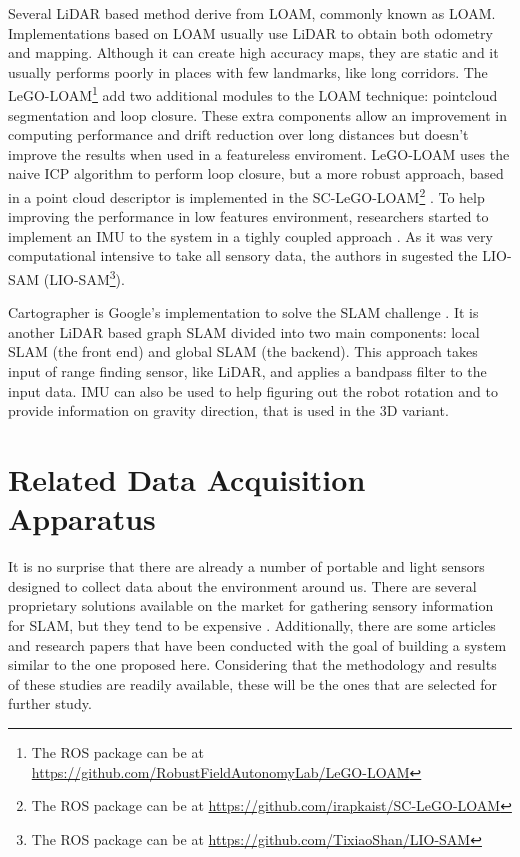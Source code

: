 Several \acs*{LiDAR} based method derive from \acl*{LOAM}, commonly known as \acs*{LOAM}. Implementations based on \acs*{LOAM} usually use \acs*{LiDAR} to obtain both odometry and mapping. Although it can create high accuracy maps, they are static and it usually performs poorly in places with few landmarks, like long corridors. The LeGO-LOAM\footnote{The \acs*{ROS} package can be at \url{https://github.com/RobustFieldAutonomyLab/LeGO-LOAM}} add two additional modules to the \acs*{LOAM} technique: pointcloud segmentation and loop closure. These extra components allow an improvement in computing performance and drift reduction over long distances but doesn't improve the results when used in a featureless enviroment. LeGO-LOAM uses the naive \acs*{ICP} algorithm to perform loop closure, but a more robust approach, based in a point cloud descriptor is implemented in the SC-LeGO-LOAM\footnote{The \acs*{ROS} package can be at \url{https://github.com/irapkaist/SC-LeGO-LOAM}} \cite{kim_scan_2018}. To help improving the performance in low features environment, researchers started to implement an \acs*{IMU} to the system in a tighly coupled approach \cite{ye2019tightly, xu_fast-lio_2021,xu_fast-lio2_2021}. As it was very computational intensive to take all sensory data, the authors in \cite{liosam2020shan} sugested the \acl*{LIO-SAM} (\acs*{LIO-SAM}\footnote{The \acs*{ROS} package can be at \url{https://github.com/TixiaoShan/LIO-SAM}}).

Cartographer is Google's implementation to solve the \acs*{SLAM} challenge \cite{hess_real-time_2016}. It is another \acs*{LiDAR} based graph \acs*{SLAM} divided into two main components: local \acs*{SLAM} (the front end) and global \acs*{SLAM} (the backend). This approach takes input of range finding sensor, like \acs*{LiDAR}, and applies a bandpass filter to the input data. \acs*{IMU} can also be used to help figuring out the robot rotation and to provide information on gravity direction, that is used in the 3D variant.
 
\section{Related Data Acquisition Apparatus}

It is no surprise that there are already a number of portable and light sensors designed to collect data about the environment around us. There are several proprietary solutions available on the market for gathering sensory information for \acs*{SLAM}, but they tend to be expensive \cite{libackpack_C50, libackpack_DGC50}. Additionally, there are some articles and research papers that have been conducted with the goal of building a system similar to the one proposed here. Considering that the methodology and results of these studies are readily available, these will be the ones that are selected for further study.

